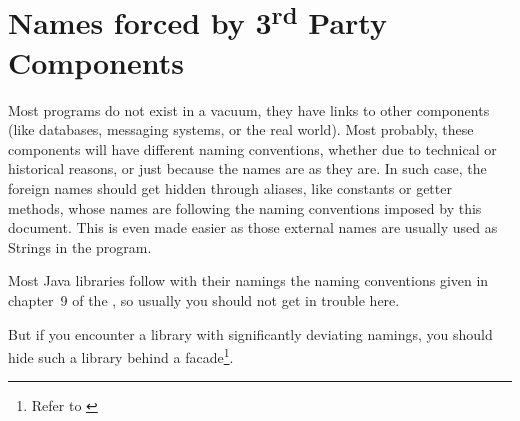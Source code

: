 \section{Names forced by 3\textsuperscript{rd} Party Components}
Most \Java programs do not exist in a vacuum, they have links to other components (like databases, messaging systems, or the real world). Most probably, these components will have different naming conventions, whether due to technical or historical reasons, or just because the names are as they are. In such case, the foreign names should get hidden through aliases, like constants or getter methods, whose names are following the naming conventions imposed by this document. This is even made easier as those external names are usually used as Strings in the program.

Most Java libraries follow with their namings the naming conventions given in chapter~9 of the  \autocite{SUN_CODE_CONVENTIONS:NamingConventions}, so usually you should not get in trouble here.

But if you encounter a library with significantly deviating namings, you should hide such a library behind a facade\footnote{Refer to \autocite{Gamma:DesignPatterns}}.

